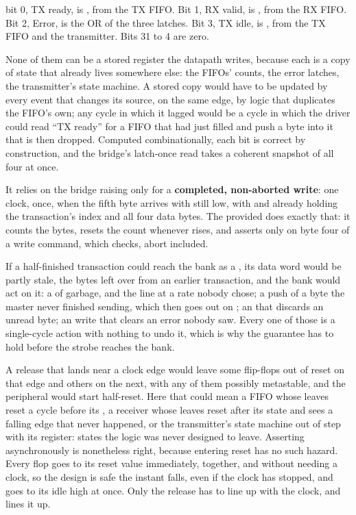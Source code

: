   bit 0, TX ready, is , from the TX FIFO. Bit 1, RX valid, is
, from the RX FIFO. Bit 2, Error, is the OR of the three 
latches. Bit 3, TX idle, is , from the TX FIFO and the
transmitter. Bits 31 to 4 are zero.

None of them can be a stored register the datapath writes, because each is a copy of state that
already lives somewhere else: the FIFOs' counts, the error latches, the transmitter's state machine.
A stored copy would have to be updated by every event that changes its source, on the same edge,
by logic that duplicates the FIFO's own; any cycle in which it lagged would be a cycle in which the
driver could read ``TX ready'' for a FIFO that had just filled and push a byte into it that is then
dropped. Computed combinationally, each bit is correct by construction, and the bridge's latch-once
read takes a coherent snapshot of all four at once.

 It relies on the bridge raising  only for a \textbf{completed, non-aborted
write}: one clock, once, when the fifth byte arrives with  still low, with 
and  already holding the transaction's index and all four data bytes. The provided
 does exactly that: it counts the bytes, resets the count whenever 
rises, and asserts  only on byte four of a write command, which
 checks, abort included.

If a half-finished transaction could reach the bank as a , its data word would be
partly stale, the bytes left over from an earlier transaction, and the bank would act on it: a
 of garbage, and the line at a rate nobody chose; a  push of a byte the
master never finished sending, which then goes out on ; an  that discards an
unread byte; an  write that clears an error nobody saw. Every one of those is a
single-cycle action with nothing to undo it, which is why the guarantee has to hold before the
strobe reaches the bank.

 A release that lands near a clock edge would leave some flip-flops out of reset on that edge
and others on the next, with any of them possibly metastable, and the peripheral would start
half-reset. Here that could mean a FIFO whose  leaves reset a cycle before its
, a receiver whose  leaves reset after its state and sees a falling edge
that never happened, or the transmitter's state machine out of step with its  register:
states the logic was never designed to leave. Asserting asynchronously is nonetheless right, because
entering reset has no such hazard. Every flop goes to its reset value immediately, together, and
without needing a clock, so the design is safe the instant  falls, even if the clock
has stopped, and  goes to its idle high at once. Only the release has to line up with the
clock, and  lines it up.

